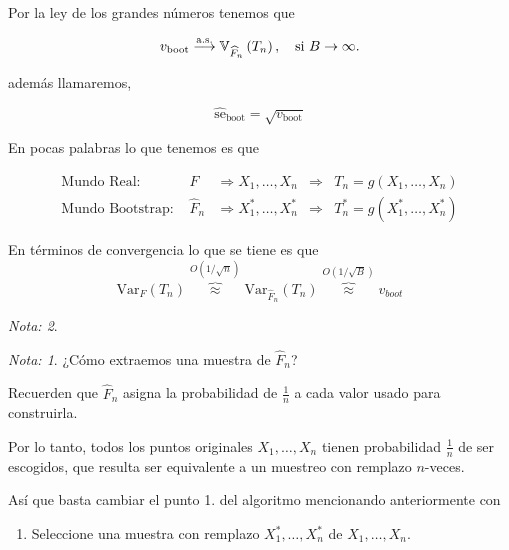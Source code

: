 \documentclass[
  12pt,
]{book}
\providecommand{\tightlist}{%
  \setlength{\itemsep}{0pt}\setlength{\parskip}{0pt}}
\theoremstyle{definition}
\theoremstyle{definition}
\theoremstyle{definition}
\theoremstyle{remark}
\newtheorem*{remark}{Nota: }
\begin{document}
Por la ley de los grandes números tenemos que

\begin{equation}
v_{\mathrm{boot}} \stackrel{\mathrm{a.s.}}{\longrightarrow} \mathbb{V}_{\widehat{F}_{n}}\left(T_{n}\right), \text {\quad si } B \rightarrow \infty.
\end{equation}

además llamaremos,

\begin{equation*}
\widehat{\mathrm{se}}_{\mathrm{boot}}=\sqrt{v_{\mathrm{boot}}}
\end{equation*}

En pocas palabras lo que tenemos es que

\begin{align*}
\text  {Mundo Real: }
& F
& \Longrightarrow  X_{1}, \ldots, X_{n}
& \Longrightarrow
& T_{n} = g\left(X_{1}, \ldots, X_{n}\right) \\
\text {Mundo Bootstrap: }
& \widehat{F}_{n}
& \Longrightarrow  X_{1}^{*}, \ldots, X_{n}^{*}
& \Longrightarrow
& T_{n}^{*}=g\left(X_{1}^{*}, \ldots, X_{n}^{*}\right)
\end{align*}

En términos de convergencia lo que se tiene es que
\[
\mathrm{Var}_{F}\left(T_{n}\right) \overbrace{\approx}^{O(1 / \sqrt{n})} \mathrm{Var}_{\widehat{F}_{n}}\left(T_{n}\right) \overbrace{\approx}^{O(1 / \sqrt{B})} v_{b o o t}
\]

\begin{remark}
\begin{remark}

{}¿Cómo extraemos una muestra de \(\hat{F}_n\)?

\end{remark}
\end{remark}

Recuerden que \(\hat{F}_{n}\) asigna la probabilidad de \(\frac{1}{n}\) a cada valor usado para construirla.

Por lo tanto, todos los puntos originales \(X_{1},\ldots,X_{n}\) tienen probabilidad \(\frac{1}{n}\) de ser escogidos, que resulta ser equivalente a un muestreo con remplazo \(n\)-veces.

Así que basta cambiar el punto 1. del algoritmo mencionando anteriormente con

\begin{enumerate}
\def\labelenumi{\arabic{enumi}.}
\tightlist
\item
  Seleccione una muestra con remplazo \(X_{1}^{*}, \ldots, X_{n}^{*}\) de \(X_{1},\ldots,X_{n}\).
\end{enumerate}
\end{document}
